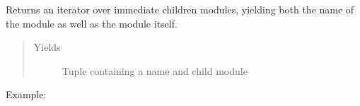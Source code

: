 \documentclass[letterpaper,10pt,english]{sphinxmanual}
\begin{document}
\begin{fulllineitems}
\begin{fulllineitems}
\begin{sphinxVerbatim}[commandchars=\\\{\}]
    
      \PYG{p}{[}\PYG{p}{]}
       
\end{sphinxVerbatim}

\end{fulllineitems}


\begin{fulllineitems}
\label{\detokenize{api/autoencoding:geology.metamodelling.SpatialAutoencoder.named_children}}
Returns an iterator over immediate children modules, yielding both
the name of the module as well as the module itself.
\begin{quote}\begin{description}
\item[{Yields}] \leavevmode
{} \textendash{} Tuple containing a name and child module

\end{description}\end{quote}

Example:

\begin{sphinxVerbatim}[commandchars=\\\{\}]
    
       \PYG{p}{[} \PYG{p}{]}
        
\end{sphinxVerbatim}


\end{fulllineitems}
\end{fulllineitems}
\end{document}
